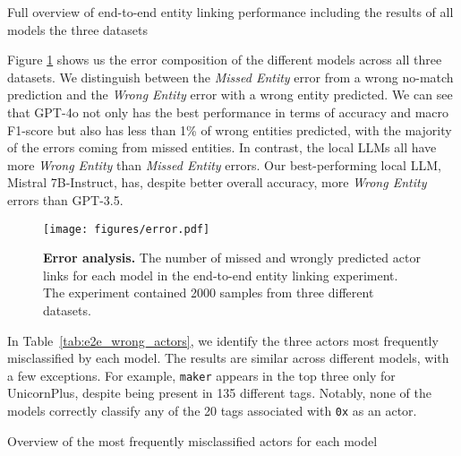 \begin{appendix}
\begin{table}
    \centering
    \caption{Full overview of end-to-end entity linking performance including the results of all models the three datasets}
    
    \label{tab:e2e_performance_full}
\end{table}

Figure \ref{fig:error} shows us the error composition of the different models across all three datasets. We distinguish between the \emph{Missed Entity} error from a wrong no-match prediction and the \emph{Wrong Entity} error with a wrong entity predicted. We can see that GPT-4o not only has the best performance in terms of accuracy and macro F1-score but also has less than 1\% of wrong entities predicted, with the majority of the errors coming from missed entities. In contrast, the local LLMs all have more \emph{Wrong Entity} than \emph{Missed Entity} errors. Our best-performing local LLM, Mistral 7B-Instruct, has, despite better overall accuracy, more \emph{Wrong Entity} errors than GPT-3.5.

\begin{figure}
    \centering
    \texttt{[image: figures/error.pdf]}
    \caption{\textbf{Error analysis.} The number of missed and wrongly predicted actor links for each model in the end-to-end entity linking experiment. The experiment contained 2000 samples from three different datasets.}
    \label{fig:error}
\end{figure}

In Table~\ref{tab:e2e_wrong_actors}, we identify the three actors most frequently misclassified by each model. The results are similar across different models, with a few exceptions. For example, \texttt{maker} appears in the top three only for UnicornPlus, despite being present in 135 different tags. Notably, none of the models correctly classify any of the 20 tags associated with \texttt{0x} as an actor.

\begin{table}
    \centering
    \caption{Overview of the most frequently misclassified actors for each model}
    
    \label{tab:e2e_wrong_actors}
\end{table}

\end{appendix}


\clearpage